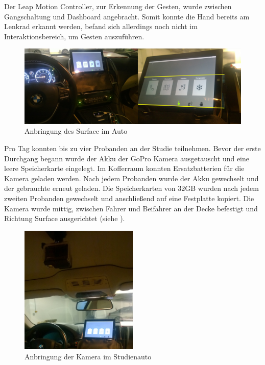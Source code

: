Der Leap Motion Controller, zur Erkennung der Gesten, wurde zwischen Gangschaltung und Dashboard angebracht. 
Somit konnte die Hand bereits am Lenkrad erkannt werden, befand sich allerdings noch nicht im Interaktionsbereich, um Gesten auszuführen. 
\begin{figure}[ht]
  \centering
  \includegraphics[width=1\textwidth]{img/AutoSetting2.jpg}
  \caption{Anbringung des Surface im Auto}
  \label{fig:AnbringungSurface}
\end{figure} 
Pro Tag konnten bis zu vier Probanden an der Studie teilnehmen. 
Bevor der erste Durchgang begann wurde der Akku der GoPro Kamera ausgetauscht und eine leere Speicherkarte eingelegt. 
Im Kofferraum konnten Ersatzbatterien für die Kamera geladen werden. 
Nach jedem Probanden wurde der Akku gewechselt und der gebrauchte erneut geladen. 
Die Speicherkarten von 32GB wurden nach jedem zweiten Probanden gewechselt und anschließend auf eine Festplatte kopiert. 
Die Kamera wurde mittig, zwischen Fahrer und Beifahrer an der Decke befestigt und Richtung Surface ausgerichtet (siehe ).
\begin{figure}[ht]
  \centering
  \includegraphics[width=0.5\textwidth]{img/Kamera3.jpg}
  \caption{Anbringung der Kamera im Studienauto}
  \label{fig:Kamera}
\end{figure} 

